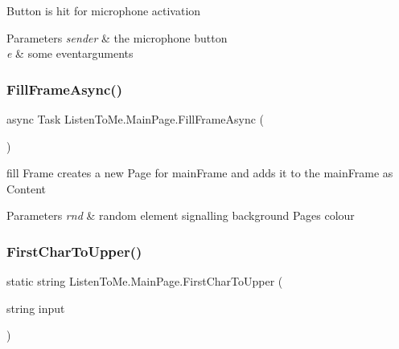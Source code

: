Button is hit for microphone activation 


\begin{DoxyParams}{Parameters}
{\em sender} & the microphone button\\
\hline
{\em e} & some eventarguments\\
\hline
\end{DoxyParams}
\mbox{\label{class_listen_to_me_1_1_main_page_aa8407277b978652a0e0ff80038bd443a}} 
\subsubsection{\texorpdfstring{Fill\+Frame\+Async()}{FillFrameAsync()}}
{\footnotesize\ttfamily async Task Listen\+To\+Me.\+Main\+Page.\+Fill\+Frame\+Async (\begin{DoxyParamCaption}{ }\end{DoxyParamCaption})\hspace{0.3cm}{\ttfamily [private]}}



fill Frame creates a new Page for main\+Frame and adds it to the main\+Frame as Content 


\begin{DoxyParams}{Parameters}
{\em rnd} & random element signalling background Page\textquotesingle{}s colour\\
\hline
\end{DoxyParams}
\mbox{\label{class_listen_to_me_1_1_main_page_af4469348ffee9a5d1a8680d2535a279b}} 
\subsubsection{\texorpdfstring{First\+Char\+To\+Upper()}{FirstCharToUpper()}}
{\footnotesize\ttfamily static string Listen\+To\+Me.\+Main\+Page.\+First\+Char\+To\+Upper (\begin{DoxyParamCaption}\item[{string}]{input }\end{DoxyParamCaption})\hspace{0.3cm}{\ttfamily [static]}}



